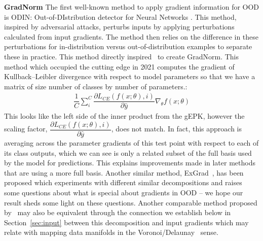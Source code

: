 \textbf{GradNorm}
The first well-known method to apply gradient information for OOD is  ODIN: Out-of-DIstribution detector for Neural Networks  \citet{liang2018}. This method, inspired by adversarial attacks, perturbs inputs by applying perturbations calculated from input gradients. The method then relies on the difference in these perturbations for in-distribution versus out-of-distribution examples to separate these in practice. This method directly inspired~\citet{huang2021} to create GradNorm. This method which occupied the cutting edge in 2021 computes the gradient of Kullback–Leibler divergence with respect to model parameters so that we have a matrix of size number of classes by number of parameters.:
\begin{align}
    \dfrac{1}{C} \sum_i^C \dfrac{\partial L_{CE}(f(x; \theta), i)}{\partial\hat y}\nabla_\theta f(x; \theta)
\end{align}
This looks like the left side of the inner product from the gEPK, however the scaling factor, $\dfrac{\partial L_{CE}(f(x; \theta), i)}{\partial \hat y}$, does not match. In fact, this approach is averaging across the parameter gradients of this test point with respect to each of its class outputs, which we can see is only a related subset of the full basis used by the model for predictions. This explains improvements made in later methods that are using a more full basis. Another similar method, ExGrad~\citep{igoe2022}, has been proposed which experiments with different similar decompositions and raises some questions about what is special about gradients in OOD -- we hope our result sheds some light on these questions. Another comparable method proposed by~\citet{sun2022deep} may also be equivalent through the connection we establish below in Section~\ref{sec:input} between this decomposition and input gradients which may relate with mapping data manifolds in the Voronoi/Delaunay~\citep{gillette2022data} sense. 

